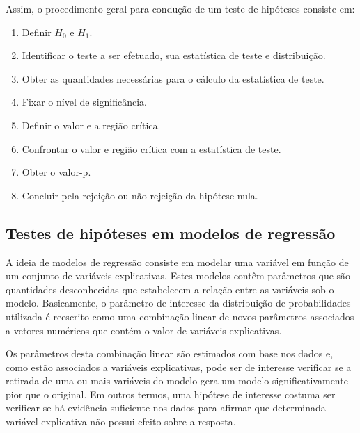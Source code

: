 Assim, o procedimento geral para condução de um teste de hipóteses 
consiste em: 

\begin{enumerate}
  
  \item Definir $H_0$ e $H_1$.
  
  \item Identificar o teste a ser efetuado, sua estatística de teste e 
distribuição.
  
  \item Obter as quantidades necessárias para o cálculo da estatística de teste.
  
  \item Fixar o nível de significância.
  
  \item Definir o valor e a região crítica.
  
  \item Confrontar o valor e região crítica com a estatística de teste.
  
  \item Obter o valor-p.
  
  \item Concluir pela rejeição ou não rejeição da hipótese nula.
  
\end{enumerate}

\subsection{Testes de hipóteses em modelos de regressão}

A ideia de modelos de regressão consiste em modelar uma variável em função de um conjunto de variáveis explicativas. Estes modelos contêm parâmetros que são quantidades desconhecidas que estabelecem a relação entre as variáveis sob o modelo. Basicamente, o parâmetro de interesse da distribuição de probabilidades utilizada é reescrito como uma combinação linear de novos parâmetros associados a vetores numéricos que contém o valor de variáveis explicativas.

Os parâmetros desta combinação linear são estimados com base nos dados e, como estão associados a variáveis explicativas, pode ser de interesse verificar se a retirada de uma ou mais variáveis do modelo gera um modelo significativamente pior que o original. Em outros termos, uma hipótese de interesse costuma ser verificar se há evidência suficiente nos dados para afirmar que determinada variável explicativa não possui efeito sobre a resposta.

